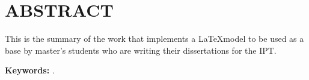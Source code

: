 \section*{ABSTRACT}

\bigskip

\begin{center}
    \textbf{\thstitleen}
    \thssubtitleen
\end{center}

\noindent This is the summary of the work that implements a \LaTeX model to be used as a base by master's students who are writing their dissertations for the IPT.

\bigskip

\noindent\textbf{Keywords:} \thskeywordsen.
\pagebreak
